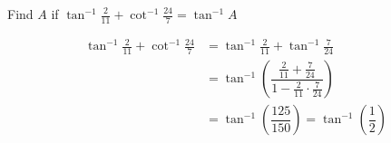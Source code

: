 
%
%
%
%
% 
% 

\question[1] Find $A$ if $\tan^{-1} \frac{2}{11} + \cot^{-1}\frac{24}{7} = \tan^{-1} A$


\ifprintanswers
\fi 

\begin{solution}[\halfpage]
	\begin{align}
	    \tan^{-1}\frac{2}{11} + \cot^{-1}\frac{24}{7} &= \tan^{-1}\frac{2}{11} + \tan^{-1}\frac{7}{24} \\
	      &= \tan^{-1}\left(\dfrac{\frac{2}{11} + \frac{7}{24}}{1-\frac{2}{11}\cdot\frac{7}{24}}\right) \\
	      &= \tan^{-1}\left(\dfrac{125}{150}\right) = \tan^{-1}\left(\dfrac{1}{2}\right)
	\end{align}
\end{solution}
